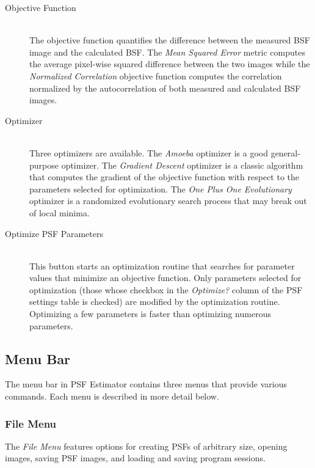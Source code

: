 \documentclass[11pt,titlepage,twoside]{article}
\begin{document}
\begin{description}

  \item[Objective Function]\hfill \\
  
  The objective function quantifies the difference between the measured BSF image and the calculated BSF. The \emph{Mean Squared Error} metric computes the average pixel-wise squared difference between the two images while the \emph{Normalized Correlation} objective function computes the correlation normalized by the autocorrelation of both measured and calculated BSF images.
  
  \item[Optimizer]\hfill \\
  
  Three optimizers are available. The \emph{Amoeba} optimizer is a good general-purpose optimizer. The \emph{Gradient Descent} optimizer is a classic algorithm that computes the gradient of the objective function with respect to the parameters selected for optimization. The \emph{One Plus One Evolutionary} optimizer is a randomized evolutionary search process that may break out of local minima.

  \item[Optimize PSF Parameters] \hfill \\
  
  This button starts an optimization routine that searches for parameter values that minimize an objective function. Only parameters selected for optimization (those whose checkbox in the \emph{Optimize?} column of the PSF settings table is checked) are modified by the optimization routine. Optimizing a few parameters is faster than optimizing numerous parameters.

\end{description}


\subsection{Menu Bar}

The menu bar in PSF Estimator contains three menus that provide various commands. Each menu is described in more detail below.

\subsubsection{File Menu}

The \emph{File Menu} features options for creating PSFs of arbitrary size, opening images, saving PSF images, and loading and saving program sessions.
\end{document}
